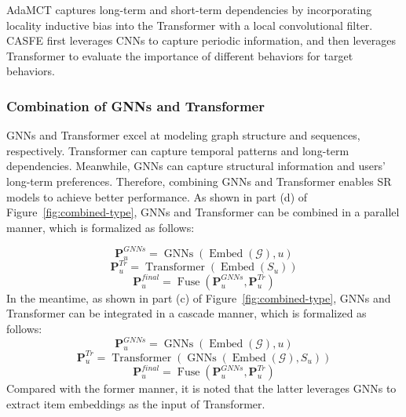 \documentclass[review]{fcs}
\begin{document}
	AdaMCT \cite{AdaMCT} captures long-term and short-term dependencies by incorporating locality inductive bias into the Transformer with a local convolutional filter. CASFE \cite{CASFE} first leverages CNNs to capture periodic information, and then leverages Transformer to evaluate the importance of different behaviors for target behaviors.
	\subsubsection{Combination of GNNs and Transformer}
	GNNs and Transformer excel at modeling graph structure and sequences, respectively. Transformer can capture temporal patterns and long-term dependencies. Meanwhile, GNNs can capture structural information and users' long-term preferences. Therefore, combining GNNs and Transformer enables SR models to achieve better performance. As shown in part (d) of Figure~\ref{fig:combined-type}, GNNs and Transformer can be combined in a parallel manner, which is formalized as follows:
	
	\begin{equation}
		\mathbf{P}_{u}^{GNNs} = \operatorname{GNNs}(\operatorname{Embed}(\mathcal{G}),u)
	\end{equation}
	\begin{equation}
		\mathbf{P}_{u}^{Tr} = \operatorname{Transformer}(\operatorname{Embed}(S_{u}))
	\end{equation}
	\begin{equation}
		\mathbf{P}_{u}^{final} = \operatorname{Fuse}(\mathbf{P}_{u}^{GNNs}, \mathbf{P}_{u}^{Tr})
	\end{equation}
	In the meantime, as shown in part (c) of Figure~\ref{fig:combined-type}, GNNs and Transformer can be integrated in a cascade manner, which is formalized as follows:
	\begin{equation}
		\mathbf{P}_{u}^{GNNs} = \operatorname{GNNs}(\operatorname{Embed}(\mathcal{G}),u)
	\end{equation}
	\begin{equation}
		\mathbf{P}_{u}^{Tr} = \operatorname{Transformer}(\operatorname{GNNs}(\operatorname{Embed}(\mathcal{G}),S_{u}))
	\end{equation}
	\begin{equation}
		\mathbf{P}_{u}^{final} = \operatorname{Fuse}(\mathbf{P}_{u}^{GNNs}, \mathbf{P}_{u}^{Tr})
	\end{equation}
	Compared with the former manner, it is noted that the latter leverages GNNs to extract item embeddings as the input of Transformer.
\end{document}
